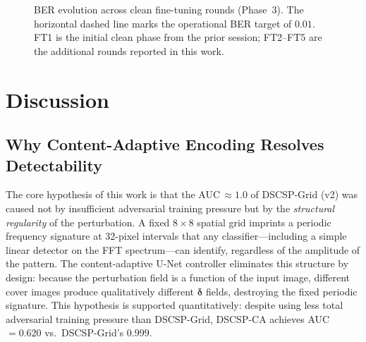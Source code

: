 \documentclass[journal]{IEEEtran}
\begin{document}
\begin{figure}[t]
\centering
{}
\caption{BER evolution across clean fine-tuning rounds (Phase~3).
         The horizontal dashed line marks the operational BER target of $0.01$.
         FT1 is the initial clean phase from the prior session; FT2--FT5 are the additional
         rounds reported in this work.}
\label{fig:ber_progression}
\end{figure}


\section{Discussion}
\label{sec:discussion}

\subsection{Why Content-Adaptive Encoding Resolves Detectability}

The core hypothesis of this work is that the AUC\,$\approx\!1.0$ of DSCSP-Grid (v2) was caused
not by insufficient adversarial training pressure but by the \emph{structural regularity} of
the perturbation.
A fixed $8\times8$ spatial grid imprints a periodic frequency signature at 32-pixel intervals
that any classifier---including a simple linear detector on the FFT spectrum---can identify,
regardless of the amplitude of the pattern.
The content-adaptive U-Net controller eliminates this structure by design: because the
perturbation field is a function of the input image, different cover images produce
qualitatively different $\bm{\delta}$ fields, destroying the fixed periodic signature.
This hypothesis is supported quantitatively: despite using less total adversarial training
pressure than DSCSP-Grid, DSCSP-CA achieves AUC\,$=\!0.620$ vs.\ DSCSP-Grid's $0.999$.
\end{document}
